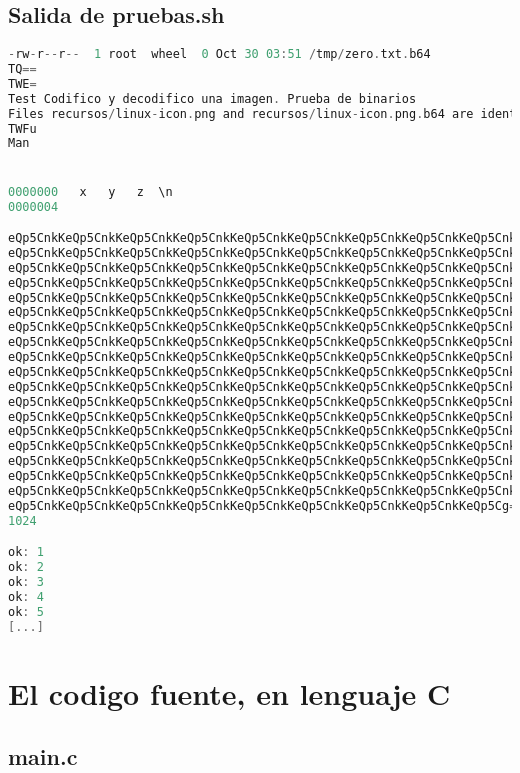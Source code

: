 \documentclass[a4paper,11pt, margin=1in]{article}
\begin{document}
\subsection{Salida de pruebas.sh}
\begin{lstlisting}[language=c,breaklines=true]
-rw-r--r--  1 root  wheel  0 Oct 30 03:51 /tmp/zero.txt.b64
TQ==
TWE=
Test Codifico y decodifico una imagen. Prueba de binarios
Files recursos/linux-icon.png and recursos/linux-icon.png.b64 are identical
TWFu
Man


0000000   x   y   z  \n
0000004

eQp5CnkKeQp5CnkKeQp5CnkKeQp5CnkKeQp5CnkKeQp5CnkKeQp5CnkKeQp5CnkKeQp5CnkK
eQp5CnkKeQp5CnkKeQp5CnkKeQp5CnkKeQp5CnkKeQp5CnkKeQp5CnkKeQp5CnkKeQp5CnkK
eQp5CnkKeQp5CnkKeQp5CnkKeQp5CnkKeQp5CnkKeQp5CnkKeQp5CnkKeQp5CnkKeQp5CnkK
eQp5CnkKeQp5CnkKeQp5CnkKeQp5CnkKeQp5CnkKeQp5CnkKeQp5CnkKeQp5CnkKeQp5CnkK
eQp5CnkKeQp5CnkKeQp5CnkKeQp5CnkKeQp5CnkKeQp5CnkKeQp5CnkKeQp5CnkKeQp5CnkK
eQp5CnkKeQp5CnkKeQp5CnkKeQp5CnkKeQp5CnkKeQp5CnkKeQp5CnkKeQp5CnkKeQp5CnkK
eQp5CnkKeQp5CnkKeQp5CnkKeQp5CnkKeQp5CnkKeQp5CnkKeQp5CnkKeQp5CnkKeQp5CnkK
eQp5CnkKeQp5CnkKeQp5CnkKeQp5CnkKeQp5CnkKeQp5CnkKeQp5CnkKeQp5CnkKeQp5CnkK
eQp5CnkKeQp5CnkKeQp5CnkKeQp5CnkKeQp5CnkKeQp5CnkKeQp5CnkKeQp5CnkKeQp5CnkK
eQp5CnkKeQp5CnkKeQp5CnkKeQp5CnkKeQp5CnkKeQp5CnkKeQp5CnkKeQp5CnkKeQp5CnkK
eQp5CnkKeQp5CnkKeQp5CnkKeQp5CnkKeQp5CnkKeQp5CnkKeQp5CnkKeQp5CnkKeQp5CnkK
eQp5CnkKeQp5CnkKeQp5CnkKeQp5CnkKeQp5CnkKeQp5CnkKeQp5CnkKeQp5CnkKeQp5CnkK
eQp5CnkKeQp5CnkKeQp5CnkKeQp5CnkKeQp5CnkKeQp5CnkKeQp5CnkKeQp5CnkKeQp5CnkK
eQp5CnkKeQp5CnkKeQp5CnkKeQp5CnkKeQp5CnkKeQp5CnkKeQp5CnkKeQp5CnkKeQp5CnkK
eQp5CnkKeQp5CnkKeQp5CnkKeQp5CnkKeQp5CnkKeQp5CnkKeQp5CnkKeQp5CnkKeQp5CnkK
eQp5CnkKeQp5CnkKeQp5CnkKeQp5CnkKeQp5CnkKeQp5CnkKeQp5CnkKeQp5CnkKeQp5CnkK
eQp5CnkKeQp5CnkKeQp5CnkKeQp5CnkKeQp5CnkKeQp5CnkKeQp5CnkKeQp5CnkKeQp5CnkK
eQp5CnkKeQp5CnkKeQp5CnkKeQp5CnkKeQp5CnkKeQp5CnkKeQp5CnkKeQp5CnkKeQp5CnkK
eQp5CnkKeQp5CnkKeQp5CnkKeQp5CnkKeQp5CnkKeQp5CnkKeQp5CnkKeQp5CnkKeQp5Cg==
1024

ok: 1
ok: 2
ok: 3
ok: 4
ok: 5
[...]
\end{lstlisting}


\section{{\normalsize El codigo fuente, en lenguaje C}}

\subsection{main.c}
\end{document}
